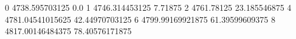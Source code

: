 0 4738.595703125 0.0
1 4746.314453125 7.71875
2 4761.78125 23.185546875
4 4781.04541015625 42.44970703125
6 4799.99169921875 61.39599609375
8 4817.00146484375 78.40576171875
